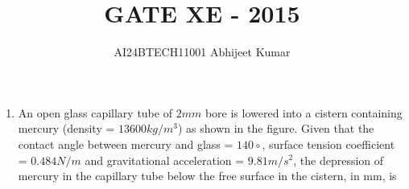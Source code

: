 \documentclass[journal]{IEEEtran}
\begin{document}

\vspace{3cm}


\renewcommand{\thefigure}{\theenumi}
\renewcommand{\thetable}{\theenumi}
\setlength{\intextsep}{10pt} %


\renewcommand{\thetable}{\theenumi}

\title{GATE XE - 2015}
\author{AI24BTECH11001 Abhijeet Kumar
}
\maketitle
\renewcommand{\thefigure}{\theenumi}
\renewcommand{\thetable}{\theenumi}
\begin{enumerate}[start=27]
    \item An open glass capillary tube of $2 mm$ bore is lowered into a cistern containing mercury (density = $13600 kg/m^3$) as shown in the figure. Given that the contact angle between mercury and glass = $140\circ$, surface tension coefficient = $0.484 N/m$ and gravitational acceleration = $9.81 m/s^2$, the depression of mercury in the capillary tube below the free surface in the cistern, in mm, is


\end{enumerate}
\end{document}
